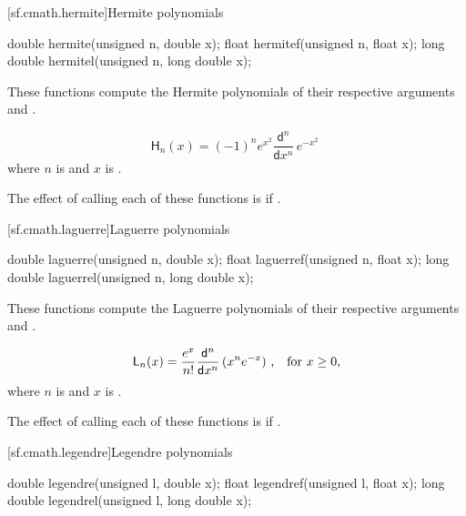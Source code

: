[sf.cmath.hermite]{Hermite polynomials}%
%
%
%
%
%
\begin{itemdecl}
double       hermite(unsigned n, double x);
float        hermitef(unsigned n, float x);
long double  hermitel(unsigned n, long double x);
\end{itemdecl}

\begin{itemdescr}
\pnum\effects
These functions compute the Hermite polynomials
of their respective arguments
 and .

\pnum\returns
\[%
  \mathsf{H}_n(x) =
  (-1)^n e^{x^2} \frac{ \mathsf{d} ^n}
		      { \mathsf{d}x^n} \, e^{-x^2}
\;
\]
where
$n$ is  and
$x$ is .

\pnum\remarks
The effect of calling each of these functions
is 
if .
\end{itemdescr}

[sf.cmath.laguerre]{Laguerre polynomials}%
%
%
%
%
%
\begin{itemdecl}
double       laguerre(unsigned n, double x);
float        laguerref(unsigned n, float x);
long double  laguerrel(unsigned n, long double x);
\end{itemdecl}

\begin{itemdescr}
\pnum
\effects
These functions compute the Laguerre polynomials
of their respective arguments
 and .

\pnum
\returns
\[ \mathsf{L}_n(x) =
     \frac{e^x}{n!} \frac{\mathsf{d}^n}{\mathsf{d}x^n} \, (x^n e^{-x})
     \text{ ,\quad for $x \ge 0$,} \]
where
$n$ is  and
$x$ is .

\pnum
\remarks
The effect of calling each of these functions
is 
if .
\end{itemdescr}

[sf.cmath.legendre]{Legendre polynomials}%
%
%
%
%
%
\begin{itemdecl}
double       legendre(unsigned l, double x);
float        legendref(unsigned l, float x);
long double  legendrel(unsigned l, long double x);
\end{itemdecl}

